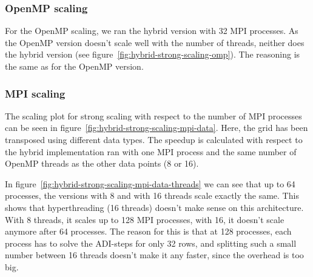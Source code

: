 \documentclass[a4paper]{article}
\begin{document}
\subsubsection{OpenMP scaling}
For the OpenMP scaling, we ran the hybrid version with 32 MPI processes.
As the OpenMP version doesn't scale well with the number of threads, neither does the hybrid version (see figure~\ref{fig:hybrid-strong-scaling-omp}).
The reasoning is the same as for the OpenMP version.


\subsubsection{MPI scaling}
The scaling plot for strong scaling with respect to the number of MPI processes can be seen in figure~\ref{fig:hybrid-strong-scaling-mpi-data}.
Here, the grid has been transposed using different data types.
The speedup is calculated with respect to the hybrid implementation ran with one MPI process and the same number of OpenMP threads as the other data points (8 or 16).

In figure~\ref{fig:hybrid-strong-scaling-mpi-data-threads} we can see that up to 64 processes, the versions with 8 and with 16 threads scale exactly the same.
This shows that hyperthreading (16 threads) doesn't make sense on this architecture.
With 8 threads, it scales up to 128 MPI processes, with 16, it doesn't scale anymore after 64 processes.
The reason for this is that at 128 processes, each process has to solve the ADI-steps for only 32 rows, and splitting such a small number between 16 threads doesn't make it any faster, since the overhead is too big.
\end{document}
